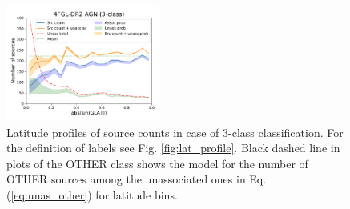 \documentclass{aa}
\begin{document}
\begin{figure}[h]
\includegraphics[width=0.45\textwidth]{plots/lat_profile_AGN_4FGL-DR2_3classes.pdf}
\caption{Latitude profiles of source counts in case of 3-class classification. For the definition of labels see Fig. \ref{fig:lat_profile}.
Black dashed line in plots of the OTHER class shows the model for the number of OTHER sources among the unassociated ones
in Eq. (\ref{eq:unas_other}) for latitude bins.}
\label{fig:lat_profile_3class}
\end{figure}
\end{document}
